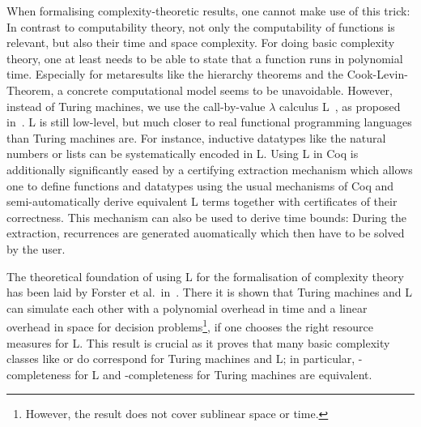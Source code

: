 When formalising complexity-theoretic results, one cannot make use of this trick: In contrast to computability theory, not only the computability of functions is relevant, but also their time and space complexity. For doing basic complexity theory, one at least needs to be able to state that a function runs in polynomial time.
Especially for metaresults like the hierarchy theorems and the Cook-Levin-Theorem, a concrete computational model seems to be unavoidable.
However, instead of Turing machines, we use the call-by-value $\lambda$ calculus L~\cite{ForsterSmolka:2017:L-Computability}, as proposed in~\cite{ForsterEtAl:2019:VerifiedTMs}. L is still low-level, but much closer to real functional programming languages than Turing machines are. For instance, inductive datatypes like the natural numbers or lists can be systematically encoded in L.
Using L in Coq is additionally significantly eased by a certifying extraction mechanism\cite{ForsterKunze:2019:Certifying-extraction} which allows one to define functions and datatypes using the usual mechanisms of Coq and semi-automatically derive equivalent L terms together with certificates of their correctness. This mechanism can also be used to derive time bounds: During the extraction, recurrences are generated auomatically which then have to be solved by the user. 

The theoretical foundation of using L for the formalisation of complexity theory has been laid by Forster et al.\ in~\cite{ForsterKunzeRoth:2019:wcbv-Reasonable}. There it is shown that Turing machines and L can simulate each other with a polynomial overhead in time and a linear overhead in space for decision problems\footnote{However, the result does not cover sublinear space or time.}, if one chooses the right resource measures for L.
This result is crucial as it proves that many basic complexity classes like \NP{} or \PC{} do correspond for Turing machines and L; in particular, \NP{}-completeness for L and \NP{}-completeness for Turing machines are equivalent.

